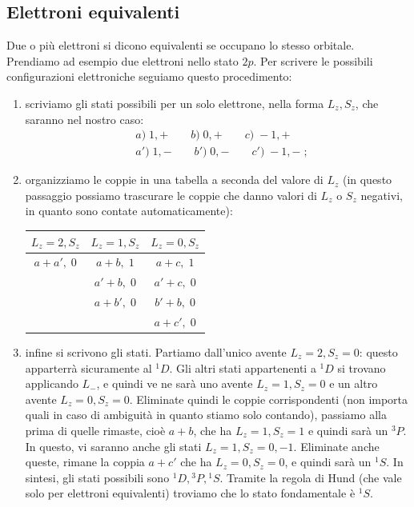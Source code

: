 \documentclass[10pt,a4paper]{report}
\theoremstyle{definition}
\numberwithin{equation}{section}
\begin{document}
\subsection*{Elettroni equivalenti}
Due o più elettroni si dicono equivalenti se occupano lo stesso orbitale. Prendiamo ad esempio due elettroni nello stato $2p$. Per scrivere le possibili configurazioni elettroniche seguiamo questo procedimento:
\begin{enumerate}
\item scriviamo gli stati possibili per un solo elettrone, nella forma $L_z,S_z$, che saranno nel nostro caso:
\begin{align*}
&a)\; 1,+\qquad b)\; 0,+\qquad c)\; -1,+ \\
&a')\; 1,-\qquad b')\; 0,-\qquad c')\; -1,-\;;
\end{align*}
\item organizziamo le coppie in una tabella a seconda del valore di $L_z$ (in questo passaggio possiamo trascurare le coppie che danno valori di $L_z$ o $S_z$ negativi, in quanto sono contate automaticamente):

\begin{table}[h]
\centering
\begin{tabular}{c|c|c}
\toprule
\multicolumn{1}{c|}{$L_z=2,S_z$} &
\multicolumn{1}{c|}{$L_z=1,S_z$} &
\multicolumn{1}{c}{$L_z=0,S_z$} \\
\midrule
$a+a',\;0$ & $a+b,\; 1$ & $a+c,\; 1$ \\
{} & $a'+b,\; 0$ & $a'+c,\;0$ \\
{} & $a+b', \;0$ & $b'+b, \;0$ \\
{} & {} & $a+c',\; 0$ \\
\bottomrule

\end{tabular}

\end{table}
\item infine si scrivono gli stati. Partiamo dall'unico avente $L_z=2, S_z=0$: questo apparterrà sicuramente al ${}^1D$. Gli altri stati appartenenti a ${}^1D$ si trovano applicando $L_-$, e quindi ve ne sarà uno avente $L_z=1,S_z=0$ e un altro avente $L_z=0,S_z=0$. Eliminate quindi le coppie corrispondenti (non importa quali in caso di ambiguità in quanto stiamo solo contando), passiamo alla prima di quelle rimaste, cioè $a+b$, che ha $L_z=1,S_z=1$ e quindi sarà un ${}^3P$. In questo, vi saranno anche gli stati $L_z=1,S_z=0,-1$. Eliminate anche queste, rimane la coppia $a+c'$ che ha $L_z=0,S_z=0$, e quindi sarà un ${}^1S$. In sintesi, gli stati possibili sono ${}^1D,{}^3P,{}^1S$. Tramite la regola di Hund (che vale solo per elettroni equivalenti) troviamo che lo stato fondamentale è ${}^1S$.
\end{enumerate}
\end{document}
